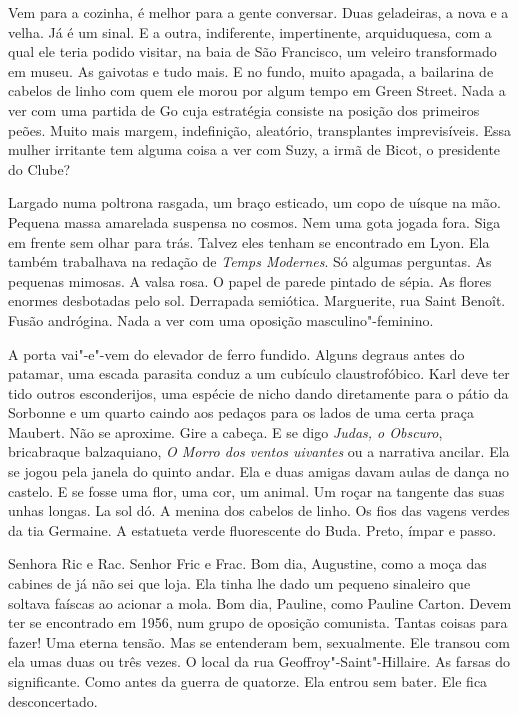 Vem para a cozinha, é melhor para a gente conversar. Duas geladeiras, a
nova e a velha. Já é um sinal. E a outra, indiferente, impertinente,
arquiduquesa, com a qual ele teria podido visitar, na baia de São
Francisco, um veleiro transformado em museu. As gaivotas e tudo mais. E
no fundo, muito apagada, a bailarina de cabelos de linho com quem ele
morou por algum tempo em Green Street. Nada a ver com uma partida de Go
cuja estratégia consiste na posição dos primeiros peões. Muito mais
margem, indefinição, aleatório, transplantes imprevisíveis. Essa mulher
irritante tem alguma coisa a ver com Suzy, a irmã de Bicot, o presidente
do Clube?

Largado numa poltrona rasgada, um braço esticado, um copo de uísque na
mão. Pequena massa amarelada suspensa no cosmos. Nem uma gota jogada
fora. Siga em frente sem olhar para trás. Talvez eles tenham se
encontrado em Lyon. Ela também trabalhava na redação de \emph{Temps
Modernes}. Só algumas perguntas. As pequenas mimosas. A valsa rosa. O
papel de parede pintado de sépia. As flores enormes desbotadas pelo sol.
Derrapada semiótica. Marguerite, rua Saint Benoît. Fusão andrógina. Nada
a ver com uma oposição masculino"-feminino.

A porta vai"-e"-vem do elevador de ferro fundido. Alguns degraus antes do
patamar, uma escada parasita conduz a um cubículo claustrofóbico. Karl
deve ter tido outros esconderijos, uma espécie de nicho dando
diretamente para o pátio da Sorbonne e um quarto caindo aos pedaços para
os lados de uma certa praça Maubert. Não se aproxime. Gire a cabeça. E
se digo \emph{Judas, o Obscuro}, bricabraque balzaquiano, \emph{O Morro
dos ventos uivantes} ou a narrativa ancilar. Ela se jogou pela janela do
quinto andar. Ela e duas amigas davam aulas de dança no castelo. E se
fosse uma flor, uma cor, um animal. Um roçar na tangente das suas unhas
longas. La sol dó. A menina dos cabelos de linho. Os fios das vagens %
verdes da tia Germaine. A estatueta verde fluorescente do Buda. Preto,
ímpar e passo.

Senhora Ric e Rac. Senhor Fric e Frac. Bom dia, Augustine, como a moça
das cabines de já não sei que loja. Ela tinha lhe dado um pequeno
sinaleiro que soltava faíscas ao acionar a mola. Bom dia, Pauline, como
Pauline Carton. Devem ter se encontrado em 1956, num grupo de oposição
comunista. Tantas coisas para fazer! Uma eterna tensão. Mas se
entenderam bem, sexualmente. Ele transou com ela umas duas ou três
vezes. O local da rua Geoffroy"-Saint"-Hillaire. As farsas do
significante. Como antes da guerra de quatorze. Ela entrou sem bater.
Ele fica desconcertado.

